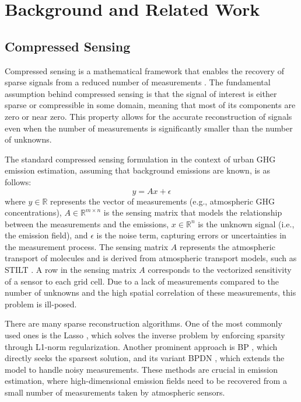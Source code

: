 
\chapter{Background and Related Work}\label{chapter:related_work}

\section{Compressed Sensing}
Compressed sensing is a mathematical framework that enables the recovery of sparse signals from a reduced number of measurements \parencite{CompressedSensingIntro}.
The fundamental assumption behind compressed sensing is that the signal of interest is either sparse or compressible in some domain, meaning that most of its components are zero or near zero.
This property allows for the accurate reconstruction of signals even when the number of measurements is significantly smaller than the number of unknowns.

The standard compressed sensing formulation in the context of urban \gls{GHG} emission estimation, assuming that background emissions are known, is as follows:
\begin{equation}
    y = A x + \epsilon
\end{equation}
where $y \in \mathbb{R}$ represents the vector of measurements (e.g., atmospheric \gls{GHG} concentrations), $A \in \mathbb{R}^{m \times n}$ is the sensing matrix that models the relationship between the measurements and the emissions, $x \in \mathbb{R}^n$ is the unknown signal (i.e., the emission field), and $\epsilon$ is the noise term, capturing errors or uncertainties in the measurement process.
The sensing matrix $A$ represents the atmospheric transport of molecules and is derived from atmospheric transport models, such as STILT \parencite{STILT}.
A row in the sensing matrix $A$ corresponds to the vectorized sensitivity of a sensor to each grid cell.
Due to a lack of measurements compared to the number of unknowns and the high spatial correlation of these measurements, this problem is ill-posed.

There are many sparse reconstruction algorithms.
One of the most commonly used ones is the \gls{Lasso} \parencite{Lasso}, which solves the inverse problem by enforcing sparsity through L1-norm regularization.
Another prominent approach is \gls{BP} \parencite{BPDN}, which directly seeks the sparsest solution, and its variant \gls{BPDN} \parencite{BPDN}, which extends the model to handle noisy measurements.
These methods are crucial in emission estimation, where high-dimensional emission fields need to be recovered from a small number of measurements taken by atmospheric sensors.

